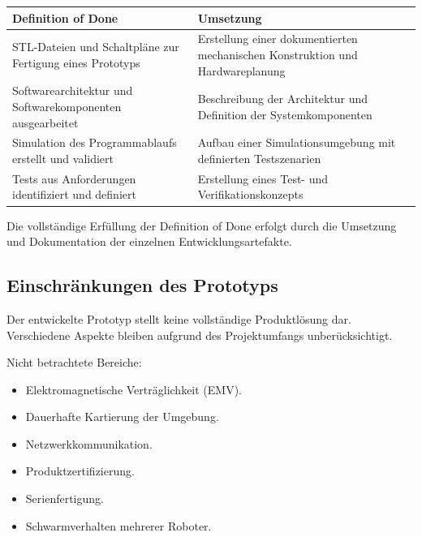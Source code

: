 \documentclass[
  a4paper,
  12pt,
  DIV=12,        %
  parskip=half,  %
  headings=small %
]{scrartcl}
\theoremstyle{definition}
\providecommand{\tightlist}{%
  \setlength{\itemsep}{0pt}\setlength{\parskip}{0pt}}
\theoremstyle{definition}
\begin{document}
\begin{longtable}[]{@{}
  >{\raggedright\arraybackslash}p{}
  >{\raggedright\arraybackslash}p{}@{}}
\toprule\noalign{}
\begin{minipage}[b]{\linewidth}\raggedright
Definition of Done
\end{minipage} & \begin{minipage}[b]{\linewidth}\raggedright
Umsetzung
\end{minipage} \\
\midrule\noalign{}
\endhead
\bottomrule\noalign{}
\endlastfoot
STL-Dateien und Schaltpläne zur Fertigung eines Prototyps & Erstellung
einer dokumentierten mechanischen Konstruktion und Hardwareplanung \\
Softwarearchitektur und Softwarekomponenten ausgearbeitet & Beschreibung
der Architektur und Definition der Systemkomponenten \\
Simulation des Programmablaufs erstellt und validiert & Aufbau einer
Simulationsumgebung mit definierten Testszenarien \\
Tests aus Anforderungen identifiziert und definiert & Erstellung eines
Test- und Verifikationskonzepts \\
\end{longtable}

Die vollständige Erfüllung der Definition of Done erfolgt durch die
Umsetzung und Dokumentation der einzelnen Entwicklungsartefakte.

\subsection{Einschränkungen des
Prototyps}\label{einschruxe4nkungen-des-prototyps}

Der entwickelte Prototyp stellt keine vollständige Produktlösung dar.
Verschiedene Aspekte bleiben aufgrund des Projektumfangs
unberücksichtigt.

Nicht betrachtete Bereiche:

\begin{itemize}
\tightlist
\item
  Elektromagnetische Verträglichkeit (EMV).
\item
  Dauerhafte Kartierung der Umgebung.
\item
  Netzwerkkommunikation.
\item
  Produktzertifizierung.
\item
  Serienfertigung.
\item
  Schwarmverhalten mehrerer Roboter.
\end{itemize}
\end{document}
